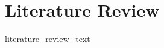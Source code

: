 \documentclass[conference]{IEEEtran}
\begin{document}
    

\section{Literature Review}
{{ literature_review_text }}
\end{document}
